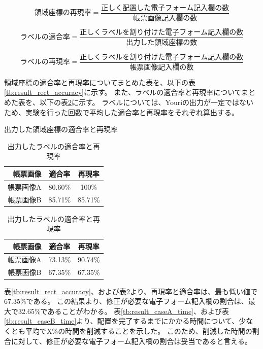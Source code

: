 \begin{equation}
    領域座標の再現率=\frac{正しく配置した電子フォーム記入欄の数}{帳票画像記入欄の数}
\end{equation}

\begin{equation}
    ラベルの適合率=\frac{正しくラベルを割り付けた電子フォーム記入欄の数}{出力した領域座標の数}
\end{equation}

\begin{equation}
    ラベルの再現率=\frac{正しくラベルを割り付けた電子フォーム記入欄の数}{帳票画像記入欄の数}
\end{equation}

領域座標の適合率と再現率についてまとめた表を、以下の表\ref{tb:result_rect_accuracy}に示す。
また、ラベルの適合率と再現率についてまとめた表を、以下の表\ref{tb:result_label_accuracy}に示す。
ラベルについては、Youriの出力が一定ではないため、実験を行った回数で平均した適合率と再現率をそれぞれ算出する。

\begin{table}[t]
    \centering
    \begin{minipage}[h]{0.47\linewidth}
        \caption{出力した領域座標の適合率と再現率}
        \label{tb:result_rect_accuracy}
        \centering
        \begin{tabular}{r|c|c}
            帳票画像 & 適合率 & 再現率 \\
            \hline \hline
            帳票画像A & 80.60\% & 100\% \\
            帳票画像B & 85.71\% & 85.71\% \\
        \end{tabular}
    \end{minipage}
    \begin{minipage}[h]{0.47\linewidth}
        \caption{出力したラベルの適合率と再現率}
        \label{tb:result_label_accuracy}
        \centering
        \begin{tabular}{r|c|c}
            帳票画像 & 適合率 & 再現率 \\
            \hline \hline
            帳票画像A & 73.13\% & 90.74\% \\
            帳票画像B & 67.35\% & 67.35\% \\
        \end{tabular}
    \end{minipage}
\end{table}

表\ref{tb:result_rect_accuracy}、および表\ref{tb:result_label_accuracy}より、再現率と適合率は、最も低い値で67.35\%である。
この結果より、修正が必要な電子フォーム記入欄の割合は、最大で32.65\%であることがわかる。
表\ref{tb:result_caseA_time}、および表\ref{tb:result_caseB_time}より、配置を完了するまでにかかる時間について、少なくとも平均でX\%の時間を削減することを示した。
このため、削減した時間の割合に対して、修正が必要な電子フォーム記入欄の割合は妥当であると言える。

